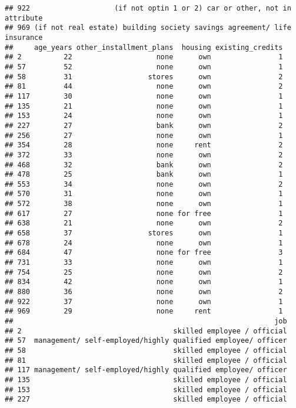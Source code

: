\documentclass[
]{article}
\begin{document}
\begin{verbatim}
## 922                    (if not optin 1 or 2) car or other, not in attribute
## 969 (if not real estate) building society savings agreement/ life insurance
##     age_years other_installment_plans  housing existing_credits
## 2          22                    none      own                1
## 57         52                    none      own                1
## 58         31                  stores      own                2
## 81         44                    none      own                2
## 117        30                    none      own                1
## 135        21                    none      own                1
## 153        24                    none      own                1
## 227        27                    bank      own                2
## 256        27                    none      own                1
## 354        28                    none     rent                2
## 372        33                    none      own                2
## 468        32                    bank      own                2
## 478        25                    bank      own                1
## 553        34                    none      own                2
## 570        31                    none      own                1
## 572        38                    none      own                1
## 617        27                    none for free                1
## 638        21                    none      own                2
## 658        37                  stores      own                1
## 678        24                    none      own                1
## 684        47                    none for free                3
## 731        33                    none      own                1
## 754        25                    none      own                2
## 834        42                    none      own                1
## 880        36                    none      own                2
## 922        37                    none      own                1
## 969        29                    none     rent                1
##                                                              job
## 2                                    skilled employee / official
## 57  management/ self-employed/highly qualified employee/ officer
## 58                                   skilled employee / official
## 81                                   skilled employee / official
## 117 management/ self-employed/highly qualified employee/ officer
## 135                                  skilled employee / official
## 153                                  skilled employee / official
## 227                                  skilled employee / official

\end{verbatim}
\end{document}
